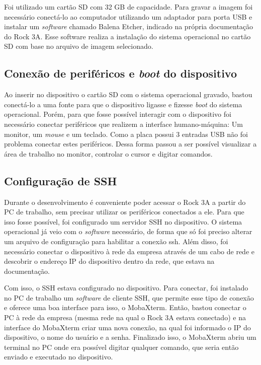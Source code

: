 Foi utilizado um cartão SD com 32 GB de capacidade. Para gravar a imagem foi necessário conectá-lo ao computador utilizando um adaptador para porta USB e instalar um \textit{software} chamado Balena Etcher, indicado na própria documentação do Rock 3A. Esse software realiza a instalação do sistema operacional no cartão SD com base no arquivo de imagem selecionado.

\subsection{Conexão de periféricos e \textit{boot} do dispositivo}
Ao inserir no dispositivo o cartão SD com o sistema operacional gravado, bastou conectá-lo a uma fonte para que o dispositivo ligasse e fizesse \textit{boot} do sistema operacional. Porém, para que fosse possível interagir com o dispositivo foi necessário conectar periféricos que realizem a interface humano-máquina: Um monitor, um \textit{mouse} e um teclado.
Como a placa possui 3 entradas USB não foi problema conectar estes periféricos. Dessa forma passou a ser possível visualizar a área de trabalho no monitor, controlar o cursor e digitar comandos.

\subsection{Configuração de SSH}
Durante o desenvolvimento é conveniente poder acessar o Rock 3A a partir do PC de trabalho, sem precisar utilizar os periféricos conectados a ele. Para que isso fosse possível, foi configurado um servidor SSH no dispositivo. O sistema operacional já veio com o \textit{software} necessário, de forma que só foi preciso alterar um arquivo de configuração para habilitar a conexão ssh. Além disso, foi necessário conectar o dispositivo à rede da empresa através de um cabo de rede e descobrir o endereço IP do dispositivo dentro da rede, que estava na documentação.

Com isso, o SSH estava configurado no dispositivo. Para conectar, foi instalado no PC de trabalho um \textit{software} de cliente SSH, que permite esse tipo de conexão e oferece uma boa interface para isso, o MobaXterm. Então, bastou conectar o PC à rede da empresa (mesma rede na qual o Rock 3A estava conectado) e na interface do MobaXterm criar uma nova conexão, na qual foi informado o IP do dispositivo, o nome do usuário e a senha. Finalizado isso, o MobaXterm abriu um terminal no PC onde era possível digitar qualquer comando, que seria então enviado e executado no dispositivo.


